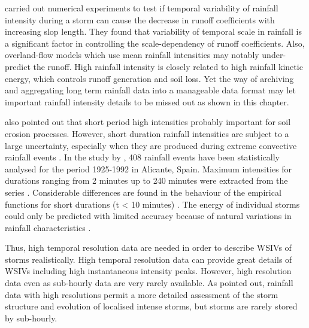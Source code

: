 \citet{wainwright2002-1271} carried out numerical experiments to test if
temporal variability of rainfall intensity during a storm can cause the decrease
in runoff coefficients with increasing slop length. They found that variability
of temporal scale in rainfall is a significant factor in controlling the
scale-dependency of runoff coefficients. Also, overland-flow models which use
mean rainfall intensities may notably under-predict the runoff.
High rainfall intensity is closely related to high rainfall kinetic energy,
which controls runoff generation and soil loss. Yet the way of archiving and
aggregating long term rainfall data into a manageable data format may let
important rainfall intensity details to be missed out as shown in this chapter.

\citet{boardman1987-36} also pointed out that
short period high intensities probably important for soil erosion processes.
However, short duration rainfall intensities are subject to a large uncertainty,
especially when they are produced during extreme convective rainfall events
\citep{garcia2001-675}. In the study by \citet{garcia2001-675}, 408 rainfall
events have been statistically analysed for the period 1925-1992 in Alicante,
Spain. Maximum intensities for durations ranging from 2 minutes up to 240
minutes were extracted from the series \citep{garcia2001-675}. Considerable
differences are found in the behaviour of the empirical functions for short
durations (t < 10 minutes) \citep{garcia2001-675}. The energy of individual
storms could only be predicted with limited accuracy because of natural
variations in rainfall characteristics \citep{vandijk2002-1}.


Thus, high temporal resolution data are needed in order to describe WSIVs of
storms realistically. High temporal resolution data can provide great details of
WSIVs including high instantaneous intensity peaks. However, high resolution
data even as sub-hourly data are very rarely available.
As \citet{allott2002-73} pointed out, rainfall data with high resolutions permit
a more detailed assessment of the storm structure and evolution of localised
intense storms, but storms are rarely stored by sub-hourly.

